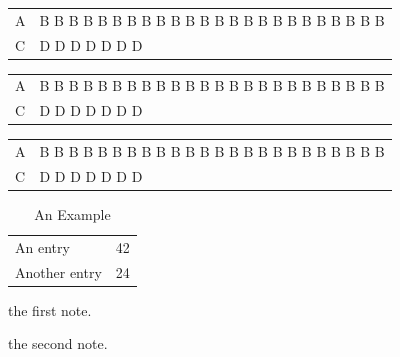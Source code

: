 \documentclass{article}
\begin{document}
\begin{center}
\begin{tabular}{lp{2cm}}
\hline
A & B B B B B B B B B B B B B B B B B B B B B B B B\\
C & D D D D D D D\\
\hline
\end{tabular}
\end{center}

\begin{center}
\begin{tabularx}{.5\textwidth}{lX}
\hline
A & B B B B B B B B B B B B B B B B B B B B B B B B\\
C & D D D D D D D\\
\hline
\end{tabularx}
\end{center}

\begin{center}
\begin{tabularx}{\textwidth}{lX}
\hline
A & B B B B B B B B B B B B B B B B B B B B B B B B\\
C & D D D D D D D\\
\hline
\end{tabularx}
\end{center}

\begin{table}
\begin{threeparttable}
\caption{An Example}
\begin{tabular}{ll}
An entry & 42\tnote{1}\\
Another entry & 24\tnote{2}\\
\end{tabular}
\begin{tablenotes}
\item [1] the first note.
\item [2] the second note.
\end{tablenotes}
\end{threeparttable}
\end{table}
\end{document}

